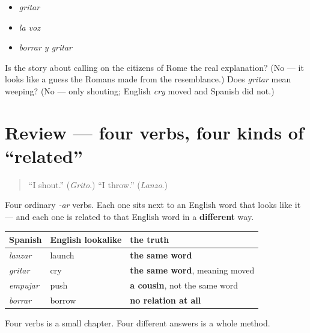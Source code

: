 \begin{itemize}
\raggedright
  \item \emph{gritar}
  \item \emph{la voz}
  \item \emph{borrar y gritar}
\end{itemize}

\begin{tcolorbox}[breakable,colback=teal!4,colframe=teal!35!black,title={Before you move on}]
Is the story about calling on the citizens of Rome the real explanation? (No — it looks like a guess the Romans made from the resemblance.) Does \emph{gritar} mean weeping? (No — only shouting; English \emph{cry} moved and Spanish did not.)
\end{tcolorbox}
\section[(review)]{Review — four verbs, four kinds of \textquotedblleft{}related\textquotedblright{}}

\label{lesson:ES-C388-repaso-cuatro-hedges}



\begin{quote}
\textquotedblleft{}I shout.\textquotedblright{} (\emph{Grito}.) \textquotedblleft{}I throw.\textquotedblright{} (\emph{Lanzo}.)
\end{quote}

\begin{grammarlens}[title={What you've built}]
Four ordinary \emph{-ar} verbs. Each one sits next to an English word that looks like it — and each one is related to that English word in a \textbf{different} way.

\noindent
\begin{tabularx}{\linewidth}{@{}>{\raggedright\arraybackslash}X>{\raggedright\arraybackslash}X>{\raggedright\arraybackslash}X@{}}
\toprule
\textbf{Spanish} & \textbf{English lookalike} & \textbf{the truth} \\
\midrule
\emph{lanzar} & launch & \textbf{the same word} \\
\emph{gritar} & cry & \textbf{the same word}, meaning moved \\
\emph{empujar} & push & \textbf{a cousin}, not the same word \\
\emph{borrar} & borrow & \textbf{no relation at all} \\
\bottomrule
\end{tabularx}

Four verbs is a small chapter. Four different answers is a whole method.
\end{grammarlens}

